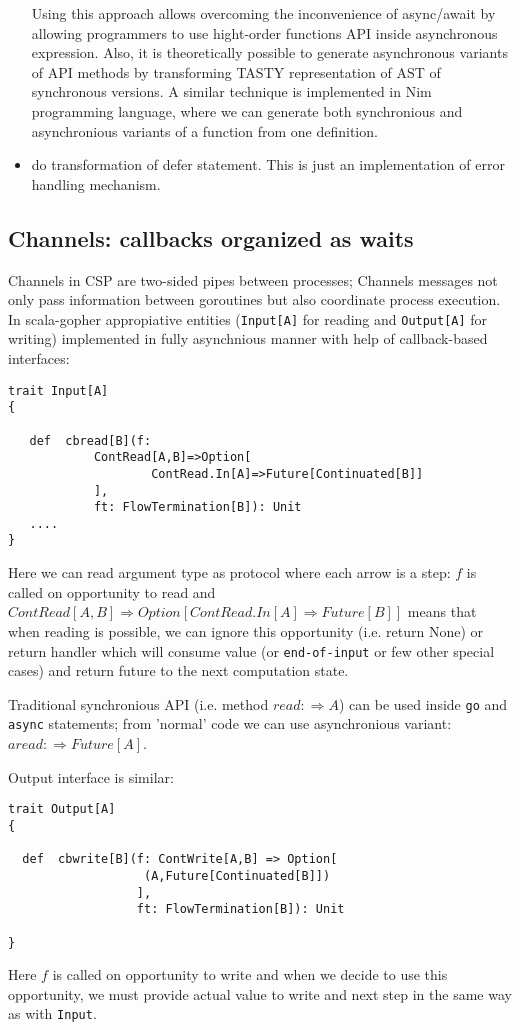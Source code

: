 \documentclass[12pt]{article}
\newcommand{\To}{\Rightarrow}
\begin{document}
\begin{itemize}
 Using this approach allows overcoming the inconvenience of async/await by allowing programmers to use hight-order functions API inside asynchronous expression. Also, it is theoretically possible to generate asynchronous variants of API methods by transforming TASTY\cite{TASTY} representation of AST of synchronous versions. A similar technique is implemented in Nim \cite{Nim} programming language, where we can generate both synchronious and asynchronious variants of a function from one definition.
  
 \item do transformation of defer statement. This is just an implementation of error handling mechanism.

\end{itemize}

\subsection{Channels: callbacks organized as waits}

  Channels in CSP are two-sided pipes between processes; Channels messages not only pass information between goroutines but also coordinate process execution.
  In scala-gopher appropiative entities (\verb|Input[A]| for reading and \verb|Output[A]| for writing) implemented in fully asynchnious manner with help of callback-based interfaces:

\begin{Verbatim}[fontsize=\small]
trait Input[A]
{

   def  cbread[B](f:
            ContRead[A,B]=>Option[
                    ContRead.In[A]=>Future[Continuated[B]]
            ],
            ft: FlowTermination[B]): Unit
   ....
}
\end{Verbatim}

  Here we can read argument type as protocol where each arrow is a step: 
    $f$ is called on opportunity to read and
      $ContRead[A,B] \To Option[ContRead.In[A] \To Future[B]]$ means that when reading is 
   possible, we can ignore this opportunity (i.e. return None) or return handler which will
   consume value (or \verb|end-of-input| or few other special cases) and return future to the next 
   computation state.

  Traditional synchronious API  (i.e. method $read:\To A$) can be used inside \verb|go| and \verb|async| statements; from 'normal' code we can use asynchronious variant: $aread: \To Future[A]$.

  Output interface is similar:
\begin{Verbatim}[fontsize=\small]
trait Output[A] 
{

  def  cbwrite[B](f: ContWrite[A,B] => Option[
                   (A,Future[Continuated[B]])
                  ],
                  ft: FlowTermination[B]): Unit
  
}
\end{Verbatim}
  Here $f$ is called on opportunity to write and when we decide to use this opportunity, we
 must provide actual value to write and next step in the same way as with \verb|Input|.
\end{document}
